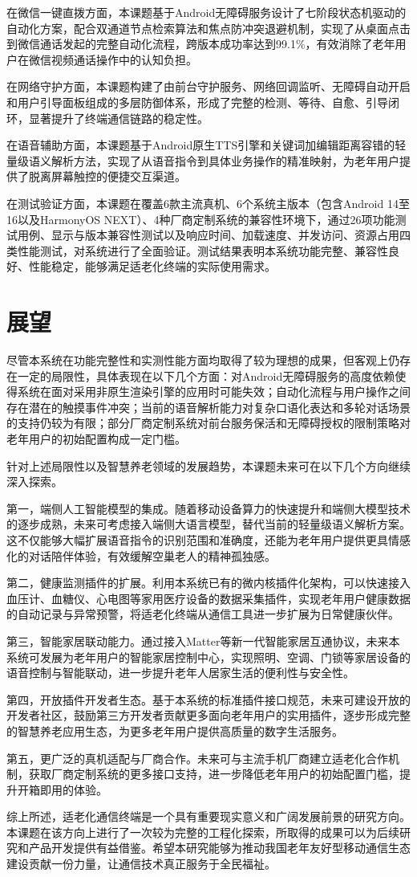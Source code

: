 在微信一键直拨方面，本课题基于Android无障碍服务设计了七阶段状态机驱动的自动化方案，配合双通道节点检索算法和焦点防冲突退避机制，实现了从桌面点击到微信通话发起的完整自动化流程，跨版本成功率达到99.1\%，有效消除了老年用户在微信视频通话操作中的认知负担。

在网络守护方面，本课题构建了由前台守护服务、网络回调监听、无障碍自动开启和用户引导面板组成的多层防御体系，形成了完整的检测、等待、自愈、引导闭环，显著提升了终端通信链路的稳定性。

在语音辅助方面，本课题基于Android原生TTS引擎和关键词加编辑距离容错的轻量级语义解析方法，实现了从语音指令到具体业务操作的精准映射，为老年用户提供了脱离屏幕触控的便捷交互渠道。

在测试验证方面，本课题在覆盖6款主流真机、6个系统主版本（包含Android 14至16以及HarmonyOS NEXT）、4种厂商定制系统的兼容性环境下，通过26项功能测试用例、显示与版本兼容性测试以及响应时间、加载速度、并发访问、资源占用四类性能测试，对系统进行了全面验证。测试结果表明本系统功能完整、兼容性良好、性能稳定，能够满足适老化终端的实际使用需求。

\section{展望}
尽管本系统在功能完整性和实测性能方面均取得了较为理想的成果，但客观上仍存在一定的局限性，具体表现在以下几个方面：对Android无障碍服务的高度依赖使得系统在面对采用非原生渲染引擎的应用时可能失效；自动化流程与用户操作之间存在潜在的触摸事件冲突；当前的语音解析能力对复杂口语化表达和多轮对话场景的支持仍较为有限；部分厂商定制系统对前台服务保活和无障碍授权的限制策略对老年用户的初始配置构成一定门槛。

针对上述局限性以及智慧养老领域的发展趋势，本课题未来可在以下几个方向继续深入探索。

第一，端侧人工智能模型的集成。随着移动设备算力的快速提升和端侧大模型技术的逐步成熟，未来可考虑接入端侧大语言模型，替代当前的轻量级语义解析方案。这不仅能够大幅扩展语音指令的识别范围和准确度，还能为老年用户提供更具情感化的对话陪伴体验，有效缓解空巢老人的精神孤独感。

第二，健康监测插件的扩展。利用本系统已有的微内核插件化架构，可以快速接入血压计、血糖仪、心电图等家用医疗设备的数据采集插件，实现老年用户健康数据的自动记录与异常预警，将适老化终端从通信工具进一步扩展为日常健康伙伴。

第三，智能家居联动能力。通过接入Matter等新一代智能家居互通协议，未来本系统可发展为老年用户的智能家居控制中心，实现照明、空调、门锁等家居设备的语音控制与智能联动，进一步提升老年人居家生活的便利性与安全性。

第四，开放插件开发者生态。基于本系统的标准插件接口规范，未来可建设开放的开发者社区，鼓励第三方开发者贡献更多面向老年用户的实用插件，逐步形成完整的智慧养老应用生态，为更多老年用户提供高质量的数字生活服务。

第五，更广泛的真机适配与厂商合作。未来可与主流手机厂商建立适老化合作机制，获取厂商定制系统的更多接口支持，进一步降低老年用户的初始配置门槛，提升开箱即用的体验。

综上所述，适老化通信终端是一个具有重要现实意义和广阔发展前景的研究方向。本课题在该方向上进行了一次较为完整的工程化探索，所取得的成果可以为后续研究和产品开发提供有益借鉴。希望本研究能够为推动我国老年友好型移动通信生态建设贡献一份力量，让通信技术真正服务于全民福祉。

\fi